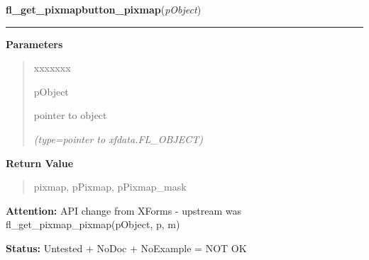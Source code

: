 \hspace{.8\funcindent}\begin{boxedminipage}{\funcwidth}

    \raggedright \textbf{fl\_get\_pixmapbutton\_pixmap}(\textit{pObject})

    \vspace{-1.5ex}

    \rule{\textwidth}{0.5\fboxrule}
\setlength{\parskip}{2ex}
\setlength{\parskip}{1ex}
      \textbf{Parameters}
      \vspace{-1ex}

      \begin{quote}
        \begin{Ventry}{xxxxxxx}

          \item[pObject]

          pointer to object

            {\it (type=pointer to xfdata.FL\_OBJECT)}

        \end{Ventry}

      \end{quote}

      \textbf{Return Value}
    \vspace{-1ex}

      \begin{quote}
      pixmap, pPixmap, pPixmap\_mask

      \end{quote}

\textbf{Attention:} API change from XForms - upstream was fl\_get\_pixmap\_pixmap(pObject, p, 
m)



\textbf{Status:} Untested + NoDoc + NoExample = NOT OK



    \end{boxedminipage}

    \label{xformslib:library:fl_read_pixmapfile}

    \vspace{0.5ex}

